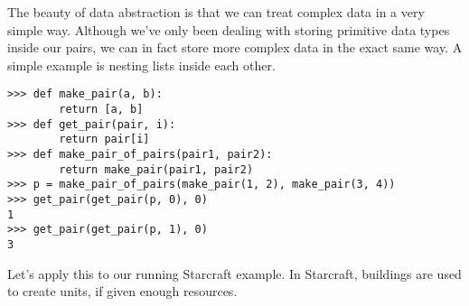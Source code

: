 The beauty of data abstraction is that we can treat complex data in a very
simple way.  Although we've only been dealing with storing primitive data types
inside our pairs, we can in fact store more complex data in the exact same
way. A simple example is nesting lists inside each other.

\begin{lstlisting}
>>> def make_pair(a, b):
        return [a, b]
>>> def get_pair(pair, i):
        return pair[i]
>>> def make_pair_of_pairs(pair1, pair2):
        return make_pair(pair1, pair2)
>>> p = make_pair_of_pairs(make_pair(1, 2), make_pair(3, 4))
>>> get_pair(get_pair(p, 0), 0)
1
>>> get_pair(get_pair(p, 1), 0)
3
\end{lstlisting}

Let's apply this to our running Starcraft example. In Starcraft, buildings are
used to create units, if given enough resources.

